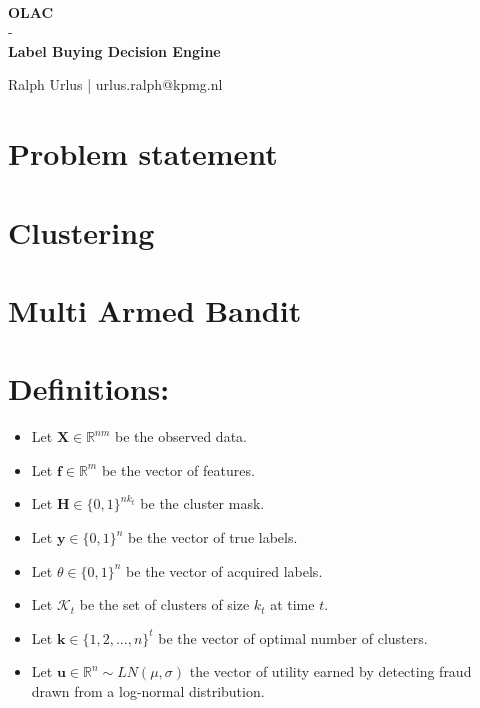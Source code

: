 \documentclass[paper=a4, fontsize=12pt]{scrartcl}
\theoremstyle{plain}
\begin{document}
\strut\\[0.8cm]
\begin{center}
\Large{\textbf{OLAC}\\
- \\
\textbf{Label Buying Decision Engine}}\\[5mm]
\normalsize
\end{center}

\vfill
\hfill Ralph Urlus | urlus.ralph@kpmg.nl
\thispagestyle{empty}

\newpage
\section*{Problem statement}


\newpage
\section*{Clustering}


\newpage
\section*{Multi Armed Bandit}


\newpage
\section*{Definitions:}
\begin{itemize}
\item Let $\mathbf{X} \in \mathbb{R}^{nm}$ be the observed data.
\item Let $\textbf{f} \in \mathbb{R}^{m}$ be the vector of features.
\item Let $\textbf{H} \in {\{0,1\}}^{nk_{t}}$ be the cluster mask.
\item Let $\textbf{y} \in {\{0,1\}}^n$ be the vector of true labels.
\item Let $\theta \in {\{0,1\}}^n$ be the vector of acquired labels.
\item Let $\mathcal{K}_{t}$ be the set of clusters of size $k_{t}$ at time $t$.
\item Let $\textbf{k} \in {\{1,2,\ldots,n\}}^{t}$ be the vector of optimal number of clusters.
\item Let $\textbf{u} \in \mathbb{R}^{n}\sim LN(\mu, \sigma)$ the vector of utility earned by detecting fraud drawn from a log-normal distribution.
\end{itemize}
\end{document}
